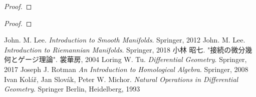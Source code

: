 \documentclass[report]{jlreq}
\begin{document}
\begin{proof}
    \TODO{}
\end{proof}

\begin{definition}
    \TODO{}
\end{definition}

\begin{proposition}
    \TODO{}
\end{proposition}

\begin{proof}
    \TODO{}
\end{proof}


\newpage
{}
{}
\renewcommand{\bibname}{参考文献}
\markboth{\bibname}{}
\begin{thebibliography}{9}
        John. M. Lee.
        \textit{Introduction to Smooth Manifolds}.
        Springer,
        2012
        John. M. Lee.
        \textit{Introduction to Riemannian Manifolds}.
        Springer,
        2018
     小林 昭七. "接続の微分幾何とゲージ理論". 裳華房, 2004
        Loring W. Tu.
        \textit{Differential Geometry}.
        Springer,
        2017
     Joseph J. Rotman \textit{An Introduction to Homological Algebra}. Springer, 2008
        Ivan Kolář, Jan Slovák, Peter W. Michor.
        \textit{Natural Operations in Differential Geometry}.
        Springer Berlin, Heidelberg,
        1993
\end{thebibliography}
\end{document}
